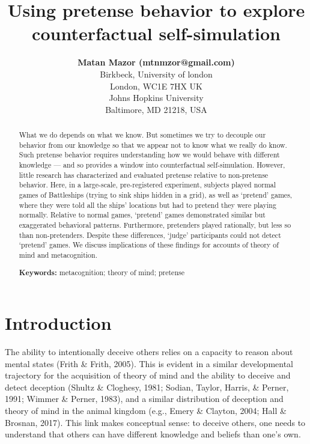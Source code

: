 \documentclass[10pt, letterpaper]{article}
\title{Using pretense behavior to explore counterfactual
self-simulation}
\author{{\large \bf Matan Mazor (mtnmzor@gmail.com)} \\ Birkbeck, University of london \\ London, WC1E 7HX UK \AND {\large \bf Chaz Firestone (chaz@jhu.edu)} \AND {\large \bf Ian Phillips (ianphillips@jhu.edu)} \\ Johns Hopkins University \\ Baltimore, MD 21218, USA}
\begin{document}
\maketitle

\begin{abstract}
What we do depends on what we know. But sometimes we try to decouple our
behavior from our knowledge so that we appear not to know what we really
do know. Such pretense behavior requires understanding how we would
behave with different knowledge --- and so provides a window into
counterfactual self-simulation. However, little research has
characterized and evaluated pretense relative to non-pretense behavior.
Here, in a large-scale, pre-registered experiment, subjects played
normal games of Battleships (trying to sink ships hidden in a grid), as
well as `pretend' games, where they were told all the ships' locations
but had to pretend they were playing normally. Relative to normal games,
`pretend' games demonstrated similar but exaggerated behavioral
patterns. Furthermore, pretenders played rationally, but less so than
non-pretenders. Despite these differences, `judge' participants could
not detect `pretend' games. We discuss implications of these findings
for accounts of theory of mind and metacognition.

\textbf{Keywords:}
metacognition; theory of mind; pretense
\end{abstract}

\hypertarget{introduction}{%
\section{Introduction}\label{introduction}}

The ability to intentionally deceive others relies on a capacity to
reason about mental states (Frith \& Frith, 2005). This is evident in a
similar developmental trajectory for the acquisition of theory of mind
and the ability to deceive and detect deception (Shultz \& Cloghesy,
1981; Sodian, Taylor, Harris, \& Perner, 1991; Wimmer \& Perner, 1983),
and a similar distribution of deception and theory of mind in the animal
kingdom (e.g., Emery \& Clayton, 2004; Hall \& Brosnan, 2017). This link
makes conceptual sense: to deceive others, one needs to understand that
others can have different knowledge and beliefs than one's own.
\end{document}
